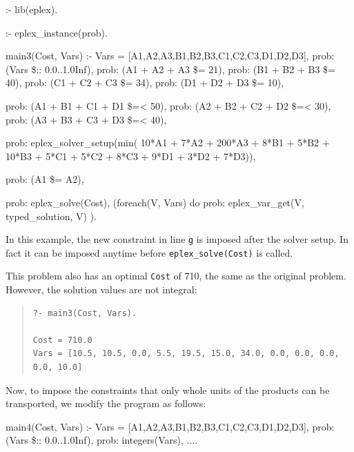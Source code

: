 {\small
\begin{code}
:- lib(eplex).

:- eplex_instance(prob).  

main3(Cost, Vars) :-
        Vars = [A1,A2,A3,B1,B2,B3,C1,C2,C3,D1,D2,D3], 
        prob: (Vars \$:: 0.0..1.0Inf),
        prob: (A1 + A2 + A3 \$= 21),
        prob: (B1 + B2 + B3 \$= 40),
        prob: (C1 + C2 + C3 \$= 34),
        prob: (D1 + D2 + D3 \$= 10),

        prob: (A1 + B1 + C1 + D1 \$=< 50),
        prob: (A2 + B2 + C2 + D2 \$=< 30),
        prob: (A3 + B3 + C3 + D3 \$=< 40),

        prob: eplex_solver_setup(min(
                10*A1 + 7*A2 + 200*A3 + 
                 8*B1 + 5*B2 + 10*B3 +
                 5*C1 + 5*C2 +  8*C3 + 
                 9*D1 + 3*D2 +  7*D3)),

        prob: (A1 \$= A2), %


        prob: eplex_solve(Cost),  
        (foreach(V, Vars) do
            prob: eplex_var_get(V, typed_solution, V) 
        ).
\end{code}}

In this example, the new constraint in line \verb'g' is imposed after the
solver setup. In fact it can be imposed anytime before
\verb'eplex_solve(Cost)' is called.

This problem also has an optimal \verb'Cost' of 710, the same as the original
problem. However, the solution values are not integral:

\begin{quote}\begin{verbatim}
?- main3(Cost, Vars).

Cost = 710.0
Vars = [10.5, 10.5, 0.0, 5.5, 19.5, 15.0, 34.0, 0.0, 0.0, 0.0, 0.0, 10.0]
\end{verbatim}\end{quote}

Now, to impose the constraints that only whole units of the products can be
transported, we modify the program as follows:

{\small
\begin{code}
main4(Cost, Vars) :-
        Vars = [A1,A2,A3,B1,B2,B3,C1,C2,C3,D1,D2,D3], 
        prob: (Vars \$:: 0.0..1.0Inf),
        prob: integers(Vars),  %
        ....%
\end{code}}

